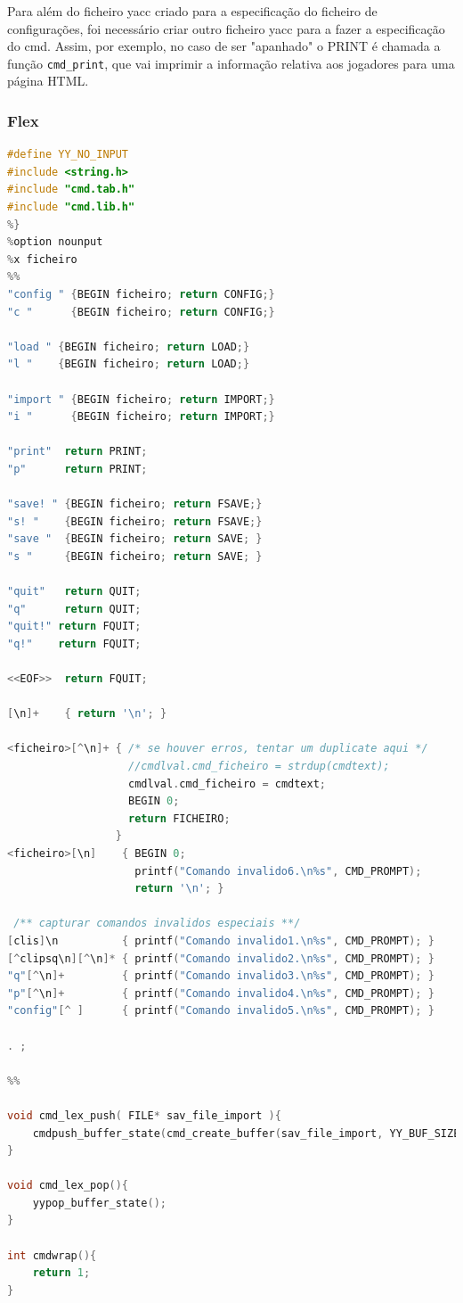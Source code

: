 \documentclass[11pt, a4paper, oneside]{article}
\begin{document}
Para além do ficheiro \textsf{yacc} criado para a especificação do ficheiro de configurações, foi necessário criar outro ficheiro \textsf{yacc} para a fazer a especificação do cmd. Assim, por exemplo, no caso de ser "apanhado" o \textsf{PRINT} é chamada a função \texttt{cmd\_print}, que vai imprimir a informação relativa aos jogadores para uma página \textsf{HTML}.

\subsubsection{\textsf{Flex}}

\begin{lstlisting}[language=C, caption={Flex do ficheiro cmd.}]
%{
#define YY_NO_INPUT
#include <string.h>
#include "cmd.tab.h"
#include "cmd.lib.h"
%}
%option nounput
%x ficheiro
%%
"config " {BEGIN ficheiro; return CONFIG;}
"c "      {BEGIN ficheiro; return CONFIG;}

"load " {BEGIN ficheiro; return LOAD;}
"l "    {BEGIN ficheiro; return LOAD;}

"import " {BEGIN ficheiro; return IMPORT;}
"i "      {BEGIN ficheiro; return IMPORT;}

"print"  return PRINT;
"p"      return PRINT;

"save! " {BEGIN ficheiro; return FSAVE;}
"s! "    {BEGIN ficheiro; return FSAVE;}
"save "  {BEGIN ficheiro; return SAVE; }
"s "     {BEGIN ficheiro; return SAVE; }

"quit"   return QUIT;
"q"      return QUIT;
"quit!" return FQUIT;
"q!"    return FQUIT;

<<EOF>>  return FQUIT;

[\n]+    { return '\n'; }

<ficheiro>[^\n]+ { /* se houver erros, tentar um duplicate aqui */
                   //cmdlval.cmd_ficheiro = strdup(cmdtext);
                   cmdlval.cmd_ficheiro = cmdtext;
                   BEGIN 0;
                   return FICHEIRO;
                 }
<ficheiro>[\n]    { BEGIN 0;
                    printf("Comando invalido6.\n%s", CMD_PROMPT);
                    return '\n'; }

 /** capturar comandos invalidos especiais **/
[clis]\n          { printf("Comando invalido1.\n%s", CMD_PROMPT); }
[^clipsq\n][^\n]* { printf("Comando invalido2.\n%s", CMD_PROMPT); }
"q"[^\n]+         { printf("Comando invalido3.\n%s", CMD_PROMPT); }
"p"[^\n]+         { printf("Comando invalido4.\n%s", CMD_PROMPT); }
"config"[^ ]      { printf("Comando invalido5.\n%s", CMD_PROMPT); }

. ;

%%

void cmd_lex_push( FILE* sav_file_import ){
    cmdpush_buffer_state(cmd_create_buffer(sav_file_import, YY_BUF_SIZE));
}

void cmd_lex_pop(){
    yypop_buffer_state();
}

int cmdwrap(){
    return 1;
}
\end{lstlisting}
\end{document}
